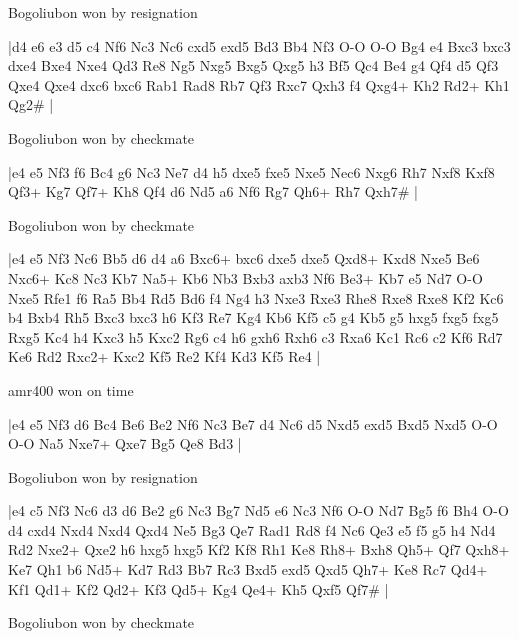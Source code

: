 \showboard

Bogoliubon won by resignation

\makegametitle
|d4 e6 e3 d5 c4 Nf6 Nc3 Nc6 cxd5 exd5 Bd3 Bb4 Nf3 O-O O-O Bg4 e4 Bxc3 bxc3 dxe4 Bxe4 Nxe4 Qd3 Re8 Ng5 Nxg5 Bxg5 Qxg5 h3 Bf5 Qc4 Be4 g4 Qf4 d5 Qf3 Qxe4 Qxe4 dxc6 bxc6 Rab1 Rad8 Rb7 Qf3 Rxc7 Qxh3 f4 Qxg4+ Kh2 Rd2+ Kh1 Qg2\#  |

\showboard

Bogoliubon won by checkmate

\makegametitle
|e4 e5 Nf3 f6 Bc4 g6 Nc3 Ne7 d4 h5 dxe5 fxe5 Nxe5 Nec6 Nxg6 Rh7 Nxf8 Kxf8 Qf3+ Kg7 Qf7+ Kh8 Qf4 d6 Nd5 a6 Nf6 Rg7 Qh6+ Rh7 Qxh7\#  |

\showboard

Bogoliubon won by checkmate

\makegametitle
|e4 e5 Nf3 Nc6 Bb5 d6 d4 a6 Bxc6+ bxc6 dxe5 dxe5 Qxd8+ Kxd8 Nxe5 Be6 Nxc6+ Kc8 Nc3 Kb7 Na5+ Kb6 Nb3 Bxb3 axb3 Nf6 Be3+ Kb7 e5 Nd7 O-O Nxe5 Rfe1 f6 Ra5 Bb4 Rd5 Bd6 f4 Ng4 h3 Nxe3 Rxe3 Rhe8 Rxe8 Rxe8 Kf2 Kc6 b4 Bxb4 Rh5 Bxc3 bxc3 h6 Kf3 Re7 Kg4 Kb6 Kf5 c5 g4 Kb5 g5 hxg5 fxg5 fxg5 Rxg5 Kc4 h4 Kxc3 h5 Kxc2 Rg6 c4 h6 gxh6 Rxh6 c3 Rxa6 Kc1 Rc6 c2 Kf6 Rd7 Ke6 Rd2 Rxc2+ Kxc2 Kf5 Re2 Kf4 Kd3 Kf5 Re4  |

\showboard

amr400 won on time

\makegametitle
|e4 e5 Nf3 d6 Bc4 Be6 Be2 Nf6 Nc3 Be7 d4 Nc6 d5 Nxd5 exd5 Bxd5 Nxd5 O-O O-O Na5 Nxe7+ Qxe7 Bg5 Qe8 Bd3  |

\showboard

Bogoliubon won by resignation

\makegametitle
|e4 c5 Nf3 Nc6 d3 d6 Be2 g6 Nc3 Bg7 Nd5 e6 Nc3 Nf6 O-O Nd7 Bg5 f6 Bh4 O-O d4 cxd4 Nxd4 Nxd4 Qxd4 Ne5 Bg3 Qe7 Rad1 Rd8 f4 Nc6 Qe3 e5 f5 g5 h4 Nd4 Rd2 Nxe2+ Qxe2 h6 hxg5 hxg5 Kf2 Kf8 Rh1 Ke8 Rh8+ Bxh8 Qh5+ Qf7 Qxh8+ Ke7 Qh1 b6 Nd5+ Kd7 Rd3 Bb7 Rc3 Bxd5 exd5 Qxd5 Qh7+ Ke8 Rc7 Qd4+ Kf1 Qd1+ Kf2 Qd2+ Kf3 Qd5+ Kg4 Qe4+ Kh5 Qxf5 Qf7\#  |

\showboard

Bogoliubon won by checkmate

